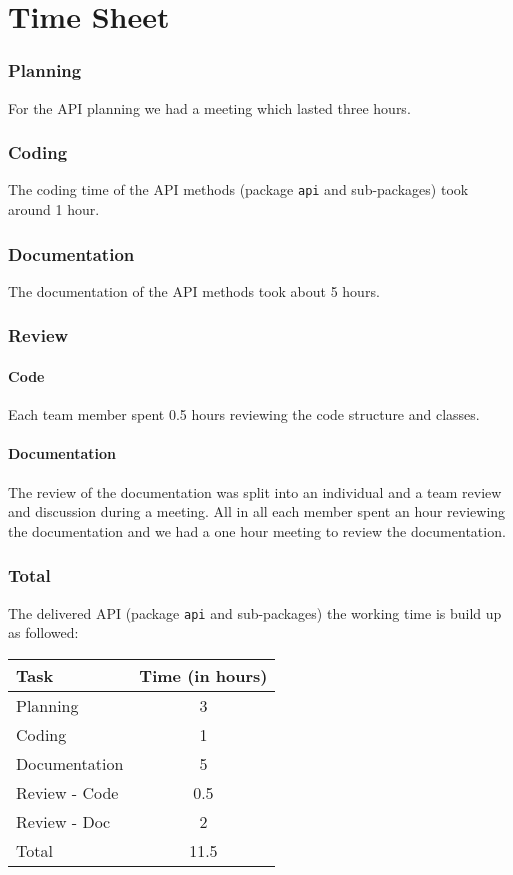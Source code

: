 \documentclass{article} %
\begin{document}
\part{Time Sheet}
\section{Planning}
For the API planning we had a meeting which lasted three hours.
\section{Coding}
The coding time of the API methods (package \texttt{api} and sub-packages) took around 1 hour.
\section{Documentation}
The documentation of the API methods took about 5 hours.
\section{Review}
\subsection{Code}
Each team member spent 0.5 hours reviewing the code structure and classes.
\subsection{Documentation}
The review of the documentation was split into an individual and a team review and discussion during a meeting. All in all each member spent an hour reviewing the documentation and we had a one hour meeting to review the documentation.
\section{Total}
The delivered API (package \texttt{api} and sub-packages) the working time is build up as followed:
\begin{center}
	\begin{tabular}{|l|c|}
	\hline  Task & Time (in hours) \\ 
	\hline  Planning &  3\\ 
	\hline  Coding &  1\\ 
	\hline  Documentation & 5 \\ 
	\hline  Review - Code&  0.5\\ 
	\hline  Review - Doc &  2\\ 
	\hline\hline   Total &  11.5\\ 
	\hline 
\end{tabular} 
\end{center}
\end{document}
